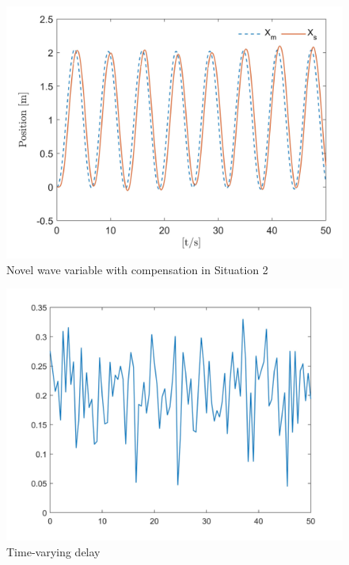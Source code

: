 
\begin{figure}[htbp]
    \centerline{\includegraphics[width=0.73\linewidth]{with_compensation.jpg}}
    \caption{Novel wave variable with compensation in Situation 2}
    \label{fig10}
\end{figure}

\begin{figure}[htbp]
    \centerline{\includegraphics[width=0.79\linewidth]{varying_time.jpg}}
    \caption{Time-varying delay}
    \label{fig11}
\end{figure}




